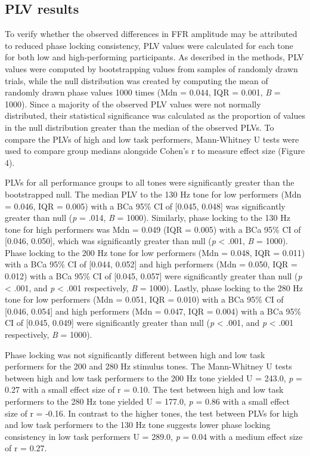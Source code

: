 \documentclass{article}
\begin{document}
\subsection*{PLV results}
To verify whether the observed differences in FFR amplitude may be attributed to reduced phase locking consistency, PLV values were calculated for each tone for both low and high-performing participants. As described in the methods, PLV values were computed by bootstrapping values from samples of randomly drawn trials, while the null distribution was created by computing the mean of randomly drawn phase values 1000 times (Mdn = 0.044, IQR = 0.001, \textit{B} = 1000). Since a majority of the observed PLV values were not normally distributed, their statistical significance was calculated as the proportion of values in the null distribution greater than the median of the observed PLVs. To compare the PLVs of high and low task performers, Mann-Whitney U tests were used to compare group medians alongside Cohen’s r to measure effect size (Figure 4).

PLVs for all performance groups to all tones were significantly greater than the bootstrapped null. The median PLV to the 130 Hz tone for low performers (Mdn = 0.046, IQR = 0.005) with a BCa 95\% CI of [0.045, 0.048] was significantly greater than null (\textit{p} = .014, \textit{B} = 1000). Similarly, phase locking to the 130 Hz tone for high performers was Mdn = 0.049 (IQR = 0.005) with a BCa 95\% CI of [0.046, 0.050], which was significantly greater than null (\textit{p} < .001, \textit{B} = 1000). Phase locking to the 200 Hz tone for low performers (Mdn = 0.048, IQR = 0.011) with a BCa 95\% CI of [0.044, 0.052] and high performers (Mdn = 0.050, IQR = 0.012) with a BCa 95\% CI of [0.045, 0.057] were significantly greater than null (\textit{p} < .001, and \textit{p} <  .001 respectively, \textit{B} = 1000). Lastly, phase locking to the 280 Hz tone for low performers (Mdn = 0.051, IQR = 0.010) with a BCa 95\% CI of [0.046, 0.054] and high performers (Mdn = 0.047, IQR = 0.004) with a BCa 95\% CI of [0.045, 0.049] were significantly greater than null (\textit{p} < .001, and \textit{p} < .001 respectively, \textit{B} = 1000).

Phase locking was not significantly different between high and low task performers for the 200 and 280 Hz stimulus tones. The Mann-Whitney U tests between high and low task performers to the 200 Hz tone yielded U = 243.0, \textit{p} = 0.27 with a small effect size of r = 0.10. The test between high and low task performers to the 280 Hz tone yielded U = 177.0, \textit{p} = 0.86 with a small effect size of r = -0.16. In contrast to the higher tones, the test between PLVs for high and low task performers to the 130 Hz tone suggests lower phase locking consistency in low task performers U = 289.0, \textit{p} = 0.04 with a medium effect size of r = 0.27.
\end{document}
